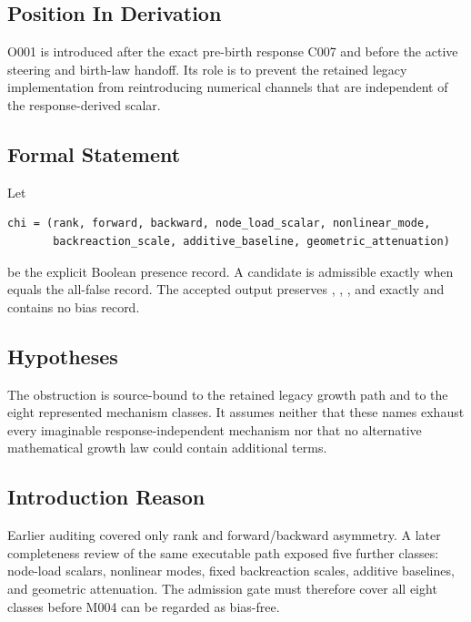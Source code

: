 \subsection{Position In Derivation}\label{position-in-derivation-18}

O001 is introduced after the exact pre-birth response C007 and before
the active steering and birth-law handoff. Its role is to prevent the
retained legacy implementation from reintroducing numerical channels
that are independent of the response-derived scalar.

\subsection{Formal Statement}\label{formal-statement-7}

Let

\begin{verbatim}
chi = (rank, forward, backward, node_load_scalar, nonlinear_mode,
       backreaction_scale, additive_baseline, geometric_attenuation)
\end{verbatim}

be the explicit Boolean presence record. A candidate
\texttt{\protect{}} is admissible
exactly when \texttt{\protect{}} equals the all-false record. The accepted
output preserves \texttt{\protect{}}, \texttt{\protect{}}, \texttt{\protect{}}, and
\texttt{\protect{}} exactly and contains no bias record.

\subsection{Hypotheses}\label{hypotheses-7}

The obstruction is source-bound to the retained legacy growth path and
to the eight represented mechanism classes. It assumes neither that
these names exhaust every imaginable response-independent mechanism nor
that no alternative mathematical growth law could contain additional
terms.

\subsection{Introduction Reason}\label{introduction-reason-21}

Earlier auditing covered only rank and forward/backward asymmetry. A
later completeness review of the same executable path exposed five
further classes: node-load scalars, nonlinear modes, fixed backreaction
scales, additive baselines, and geometric attenuation. The admission
gate must therefore cover all eight classes before M004 can be regarded
as bias-free.

